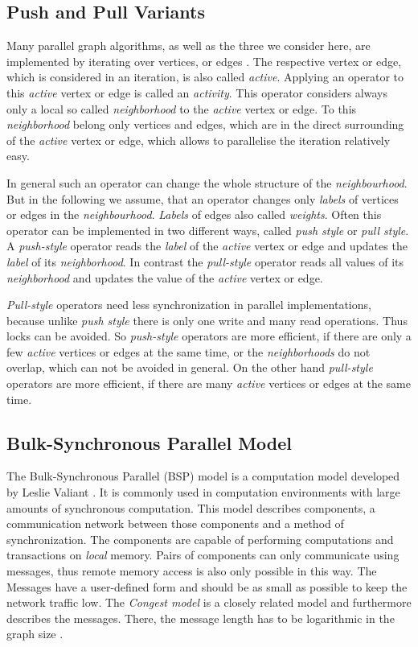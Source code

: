 \subsection{Push and Pull Variants}
Many parallel graph algorithms, as well as the three we consider here, are implemented by iterating over vertices, or edges \cite{tao}.
The respective vertex or edge, which is considered in an iteration, is also called \emph{active}.
Applying an operator to this \emph{active} vertex or edge is called an \emph{activity}.
This operator considers always only a local so called \emph{neighborhood} to the \emph{active} vertex or edge.
To this \emph{neighborhood} belong only vertices and edges, which are in the direct surrounding of the \emph{active} vertex or edge, which allows to parallelise the iteration relatively easy.

In general such an operator can change the whole structure of the \emph{neighbourhood}.
But in the following we assume, that an operator changes only \emph{labels} of vertices or edges in the \emph{neighbourhood}.
\emph{Labels} of edges also called \emph{weights}.
Often this operator can be implemented in two different ways, called \emph{push style} or \emph{pull style}.
A \emph{push-style} operator reads the \emph{label} of the \emph{active} vertex or edge and updates the \emph{label} of its \emph{neighborhood}.
In contrast the \emph{pull-style} operator reads all values of its \emph{neighborhood} and updates the value of the \emph{active} vertex or edge.

\emph{Pull-style} operators need less synchronization in parallel implementations, because unlike \emph{push style} there is only one write and many read operations. Thus locks can be avoided. So \emph{push-style} operators are more efficient, if there are only a few \emph{active} vertices or edges at the same time, or the \emph{neighborhoods} do not overlap, which can not be avoided in general. On the other hand \emph{pull-style} operators are more efficient, if there are many \emph{active} vertices or edges at the same time.

\subsection{Bulk-Synchronous Parallel Model}
\label{sec:bsp}
The Bulk-Synchronous Parallel (BSP) model is a computation model developed by Leslie Valiant \cite{bsp}. It is commonly used in computation environments with large amounts of synchronous computation.
This model describes components, a communication network between those components and a method of synchronization.
The components are capable of performing computations and transactions on \emph{local} memory. Pairs of components can only communicate using messages, thus remote memory access is also only possible in this way.
The Messages have a user-defined form and should be as small as possible to keep the network traffic low. The \emph{Congest model} is a closely related model and furthermore describes the messages. There, the message length has to be logarithmic in the graph size .

